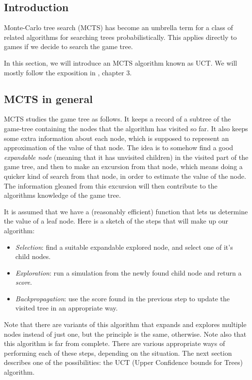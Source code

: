 \subsection {Introduction}

Monte-Carlo tree search (MCTS) has become an umbrella term for a class of related algorithms for searching trees probabilistically.
This applies directly to games if we decide to search the game tree.

In this section, we will introduce an MCTS algorithm known as UCT.
We will mostly follow the exposition in \citep{mcts_survey12}, chapter 3.

\subsection {MCTS in general}

MCTS studies the game tree as follows.
It keeps a record of a subtree of the game-tree containing the nodes that the algorithm has visited so far.
It also keeps some extra information about each node, which is supposed to represent an approximation of the value of that node.
The idea is to somehow find a good \emph{expandable node} (meaning that it has unvisited children) in the visited part of the game tree, and then to make an excursion from that node, which means doing a quicker kind of search from that node, in order to estimate the value of the node. The information gleaned from this excursion will then contribute to the algorithms knowledge of the game tree.

It is assumed that we have a (reasonably efficient) function that lets us determine the value of a leaf node.
Here is a sketch of the steps that will make up our algorithm:

\begin{itemize}
\item \emph{Selection}: find a suitable expandable explored node, and select one of it's child nodes.
\item \emph{Exploration}: run a simulation from the newly found child node and return a \emph{score}.
\item \emph{Backpropagation}: use the score found in the previous step to update the visited tree in an appropriate way.
\end{itemize}
Note that there are variants of this algorithm that expands and explores multiple nodes instead of just one, but the principle is the same, otherwise.
Note also that this algorithm is far from complete. There are various appropriate ways of performing each of these steps, depending on the situation.
The next section describes one of the possibilities: the UCT (Upper Confidence bounds for Trees) algorithm.


